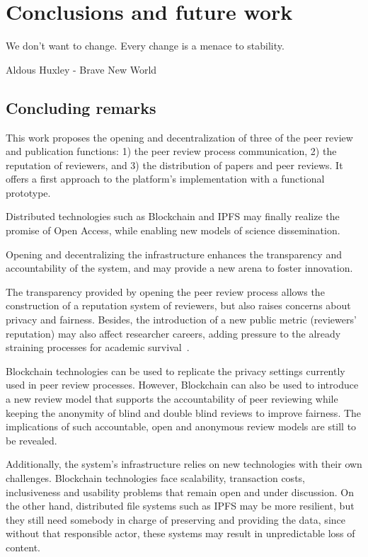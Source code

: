 \chapter{Conclusions and future work}

\begin{FraseCelebre}
  \begin{Frase}
    We don't want to change. Every change is a menace to stability.
  \end{Frase}
  \begin{Fuente}
    Aldous Huxley - Brave New World
  \end{Fuente}
\end{FraseCelebre}

\section{Concluding remarks}

This work proposes the opening and decentralization of three of the peer review
and publication functions: 1) the peer review process communication, 2) the
reputation of reviewers, and 3) the distribution of papers and peer reviews. It
offers a first approach to the platform's implementation with a functional
prototype.

Distributed technologies such as Blockchain and IPFS may finally realize the
promise of Open Access, while enabling new models of science dissemination.

Opening and decentralizing the infrastructure enhances the transparency and
accountability of the system, and may provide a new arena to foster innovation.

The transparency provided by opening the peer review process allows the
construction of a reputation system of reviewers, but also raises concerns about
privacy and fairness. Besides, the introduction of a new public metric
(reviewers' reputation) may also affect researcher careers, adding pressure to
the already straining processes for academic survival~\cite{de2005publish}.

Blockchain technologies can be used to replicate the privacy settings currently
used in peer review processes. However, Blockchain can also be used to introduce
a new review model that supports the accountability of peer reviewing while
keeping the anonymity of blind and double blind reviews to improve fairness. The
implications of such accountable, open and anonymous review models are still to
be revealed.

Additionally, the system's infrastructure relies on new technologies with their
own challenges. Blockchain technologies face scalability, transaction costs,
inclusiveness and usability problems that remain open and under discussion. On
the other hand, distributed file systems such as IPFS may be more resilient, but
they still need somebody in charge of preserving and providing the data, since
without that responsible actor, these systems may result in unpredictable loss of content.

